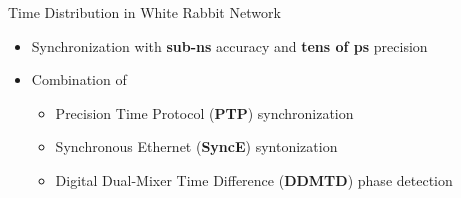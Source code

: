 \documentclass[compress,red]{beamer}
\begin{document}
\begin{frame}{Time Distribution in White Rabbit Network}

  \begin{itemize}
    \item Synchronization with {\bf sub-ns} accuracy and {\bf tens of  ps} precision
    \item Combination of
	\begin{itemize}
	  \item Precision Time Protocol ({\bf PTP}) synchronization
	  \item Synchronous Ethernet ({\bf SyncE}) syntonization
	  \item Digital Dual-Mixer Time Difference ({\bf DDMTD}) phase detection
	\end{itemize}
  \end{itemize}
\end{frame}
\end{document}
